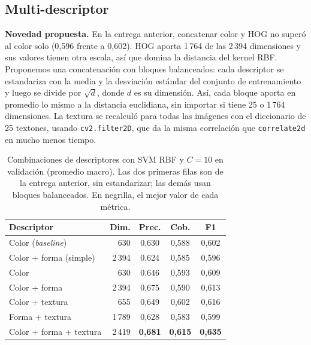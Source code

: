 \subsection{Multi-descriptor}
\label{sec:Resultados_multidescriptor}

\textbf{Novedad propuesta.} En la entrega anterior, concatenar color y HOG no superó al color solo (0,596 frente a 0,602). HOG aporta 1\,764 de las 2\,394 dimensiones y sus valores tienen otra escala, así que domina la distancia del kernel RBF. Proponemos una concatenación con bloques balanceados: cada descriptor se estandariza con la media y la desviación estándar del conjunto de entrenamiento y luego se divide por $\sqrt{d}$, donde $d$ es su dimensión. Así, cada bloque aporta en promedio lo mismo a la distancia euclidiana, sin importar si tiene 25 o 1\,764 dimensiones. La textura se recalculó para todas las imágenes con el diccionario de 25 textones, usando \texttt{cv2.filter2D}, que da la misma correlación que \texttt{correlate2d} en mucho menos tiempo.

\begin{table}[t]
  \centering
  \small
  \setlength{\tabcolsep}{4pt}
  \caption{Combinaciones de descriptores con SVM RBF y $C=10$ en validación (promedio macro). Las dos primeras filas son de la entrega anterior, sin estandarizar; las demás usan bloques balanceados. En negrilla, el mejor valor de cada métrica.}
  \label{tab:multi}
  \begin{tabular}{@{}lrccc@{}}
    \toprule
    Descriptor & Dim. & Prec. & Cob. & F1 \\
    \midrule
    Color (\textit{baseline})       &    630 & 0,630 & 0,588 & 0,602 \\
    Color + forma (simple)          & 2\,394 & 0,624 & 0,585 & 0,596 \\
    \midrule
    Color                           &    630 & 0,646 & 0,593 & 0,609 \\
    Color + forma                   & 2\,394 & 0,675 & 0,590 & 0,613 \\
    Color + textura                 &    655 & 0,649 & 0,602 & 0,616 \\
    Forma + textura                 & 1\,789 & 0,628 & 0,583 & 0,599 \\
    Color + forma + textura         & 2\,419 & \textbf{0,681} & \textbf{0,615} & \textbf{0,635} \\
    \bottomrule
  \end{tabular}
\end{table}

